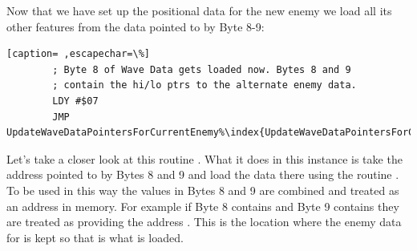Now that we have set up the positional data for the new enemy we load all its other features from the data pointed
to by Byte 8-9:

\begin{lstlisting}[caption= ,escapechar=\%]
        ; Byte 8 of Wave Data gets loaded now. Bytes 8 and 9
        ; contain the hi/lo ptrs to the alternate enemy data.
        LDY #$07
        JMP UpdateWaveDataPointersForCurrentEnemy%\index{UpdateWaveDataPointersForCurrentEnemy}%
\end{lstlisting}

Let's take a closer look at this routine . What it does in this
instance is take the address pointed to by Bytes 8 and 9 and load the data there using the routine
. To be used in this way the values in Bytes 8 and 9 are combined and treated
as an address in memory. For example if Byte 8 contains  and Byte 9 contains  they
are treated as providing the address . This is the location where the enemy data for
 is kept so that is what is loaded.



